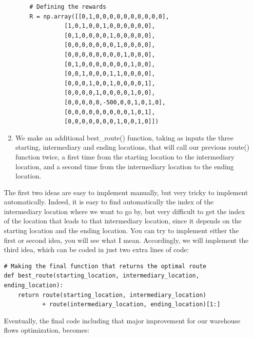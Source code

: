 \documentclass[]{book}
\begin{document}
\begin{enumerate}
    \begin{lstlisting}
    # Defining the rewards
    R = np.array([[0,1,0,0,0,0,0,0,0,0,0,0],
              [1,0,1,0,0,1,0,0,0,0,0,0],
              [0,1,0,0,0,0,1,0,0,0,0,0],
              [0,0,0,0,0,0,0,1,0,0,0,0],
              [0,0,0,0,0,0,0,0,1,0,0,0],
              [0,1,0,0,0,0,0,0,0,1,0,0],
              [0,0,1,0,0,0,1,1,0,0,0,0],
              [0,0,0,1,0,0,1,0,0,0,0,1],
              [0,0,0,0,1,0,0,0,0,1,0,0],
              [0,0,0,0,0,-500,0,0,1,0,1,0],
              [0,0,0,0,0,0,0,0,0,1,0,1],
              [0,0,0,0,0,0,0,1,0,0,1,0]])
    \end{lstlisting}
    \item We make an additional best\_route() function, taking as inputs the three starting, intermediary and ending locations, that will call our previous route() function twice, a first time from the starting location to the intermediary location, and a second time from the intermediary location to the ending location.
\end{enumerate}

The first two ideas are easy to implement manually, but very tricky to implement automatically. Indeed, it is easy to find automatically the index of the intermediary location where we want to go by, but very difficult to get the index of the location that leads to that intermediary location, since it depends on the starting location and the ending location. You can try to implement either the first or second idea, you will see what I mean. Accordingly, we will implement the third idea, which can be coded in just two extra lines of code:

\begin{lstlisting}
# Making the final function that returns the optimal route
def best_route(starting_location, intermediary_location, ending_location):
    return route(starting_location, intermediary_location)
           + route(intermediary_location, ending_location)[1:]
\end{lstlisting}

Eventually, the final code including that major improvement for our warehouse flows optimization, becomes:
\end{document}
